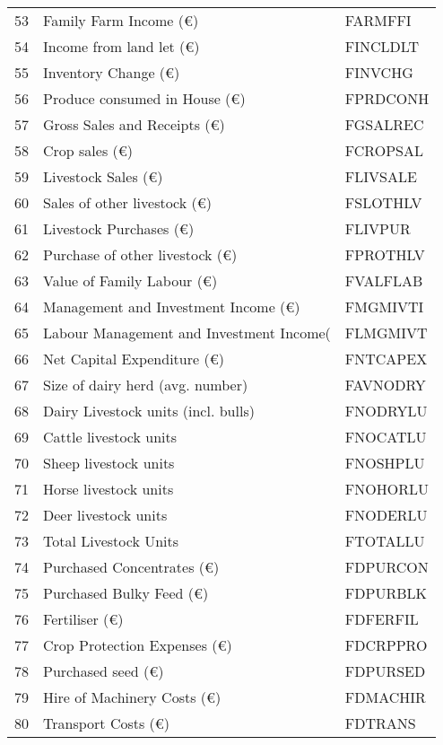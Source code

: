 \documentclass{article}\usepackage{graphicx, color}
\begin{document}
\begin{flushleft}
\begin{table}[ht]
\begin{center}
\begin{tabular}{rll}
  53 & Family Farm Income               (€) & FARMFFI \\ 
  54 & Income from land let             (€) & FINCLDLT \\ 
  55 & Inventory Change                 (€) & FINVCHG \\ 
  56 & Produce consumed in House        (€) & FPRDCONH \\ 
  57 & Gross Sales and Receipts         (€) & FGSALREC \\ 
  58 & Crop sales                       (€) & FCROPSAL \\ 
  59 & Livestock Sales                  (€) & FLIVSALE \\ 
  60 & Sales of other livestock         (€) & FSLOTHLV \\ 
  61 & Livestock Purchases              (€) & FLIVPUR \\ 
  62 & Purchase of other livestock      (€) & FPROTHLV \\ 
  63 & Value of Family Labour           (€) & FVALFLAB \\ 
  64 & Management and Investment Income (€) & FMGMIVTI \\ 
  65 & Labour Management and Investment Income( & FLMGMIVT \\ 
  66 & Net Capital Expenditure          (€) & FNTCAPEX \\ 
  67 & Size of dairy herd  (avg. number) & FAVNODRY \\ 
  68 & Dairy Livestock units (incl. bulls) & FNODRYLU \\ 
  69 & Cattle livestock units & FNOCATLU \\ 
  70 & Sheep livestock units & FNOSHPLU \\ 
  71 & Horse livestock units & FNOHORLU \\ 
  72 & Deer livestock units & FNODERLU \\ 
  73 & Total Livestock Units & FTOTALLU \\ 
  74 & Purchased Concentrates      (€) & FDPURCON \\ 
  75 & Purchased Bulky Feed        (€) & FDPURBLK \\ 
  76 & Fertiliser                  (€) & FDFERFIL \\ 
  77 & Crop Protection Expenses    (€) & FDCRPPRO \\ 
  78 & Purchased seed              (€) & FDPURSED \\ 
  79 & Hire of Machinery Costs     (€) & FDMACHIR \\ 
  80 & Transport Costs             (€) & FDTRANS \\ 

\end{tabular}
\end{center}
\end{table}
\end{flushleft}
\end{document}
